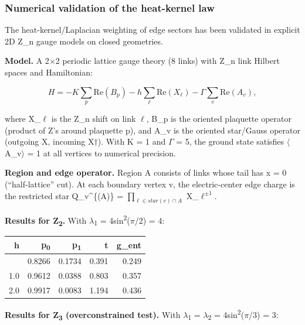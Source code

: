 \documentclass[11pt,a4paper]{article}
\theoremstyle{remark}
\begin{document}
\subsubsection{Numerical validation of the heat-kernel law}\label{numerical-validation-of-the-heat-kernel-law}

The heat-kernel/Laplacian weighting of edge sectors has been validated in
explicit 2D Z\_n gauge models on closed geometries.

\textbf{Model.} A 2\ensuremath{\times}2 periodic lattice gauge theory (8 links) with
Z\_n link Hilbert spaces and Hamiltonian:

\[
H = -K \sum_p \mathrm{Re}(B_p) - h \sum_\ell \mathrm{Re}(X_\ell) - \Gamma \sum_v \mathrm{Re}(A_v),
\]

where X\_\ensuremath{\ell} is the Z\_n shift on link \ensuremath{\ell}, B\_p is the oriented
plaquette operator (product of Z's around plaquette p), and A\_v is the
oriented star/Gauss operator (outgoing X, incoming X\ensuremath{\dagger}). With
K = 1 and \ensuremath{\Gamma} = 5, the ground state satisfies \ensuremath{\langle}A\_v\ensuremath{\rangle} = 1
at all vertices to numerical precision.

\textbf{Region and edge operator.} Region A consists of links whose tail has
x = 0 (``half-lattice'' cut). At each boundary vertex v, the electric-center
edge charge is the restricted star Q\_v\^{}\{(A)\} = \(\prod_{\ell \in star(v) \cap A}\) X\_\(\ell^{\pm1}\).

\textbf{Results for Z\textsubscript{2}.} With \ensuremath{\lambda}\textsubscript{1} = 4sin\textsuperscript{2}(\ensuremath{\pi}/2) = 4:

{\def\LTcaptype{none} %
\begin{longtable}[]{@{}rrrrr@{}}
\toprule\noalign{}
h & p\textsubscript{0} & p\textsubscript{1} & t & g\_ent \\
\midrule\noalign{}
\endhead
\bottomrule\noalign{}
\endlastfoot
0.5 & 0.8266 & 0.1734 & 0.391 & 0.249 \\
1.0 & 0.9612 & 0.0388 & 0.803 & 0.357 \\
2.0 & 0.9917 & 0.0083 & 1.194 & 0.436 \\
\end{longtable}
}

\textbf{Results for Z\textsubscript{3} (overconstrained test).} With
\ensuremath{\lambda}\textsubscript{1} = \ensuremath{\lambda}\textsubscript{2} = 4sin\textsuperscript{2}(\ensuremath{\pi}/3) = 3:
\end{document}
